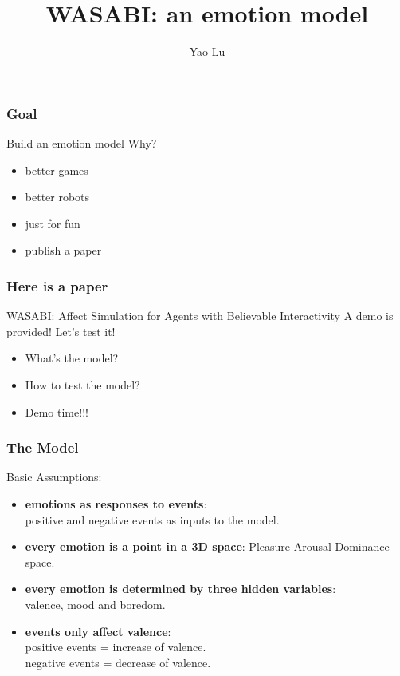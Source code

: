 \documentclass{beamer}
\begin{document}
\title{WASABI: an emotion model}   
\author{Yao Lu} 
\date{} 

\maketitle

\begin{frame}
\frametitle{Goal}
Build an emotion model
\newline \newline \newline
Why?
\begin{itemize}
\item better games
\item better robots
\item just for fun
\item publish a paper
\end{itemize}
\end{frame}

\begin{frame}
\frametitle{Here is a paper}
WASABI: Affect Simulation for Agents with
Believable Interactivity 
\newline \newline \newline
A demo is provided!
\newline \newline \newline
Let's test it!
\begin{itemize}
\item What's the model?
\item How to test the model?
\item Demo time!!!
\end{itemize}
\end{frame}


\begin{frame}
\frametitle{The Model}
Basic Assumptions:
\begin{itemize}
\item \textbf{emotions as responses to events}: \\ positive and negative events as inputs to the model.
\item \textbf{every emotion is a point in a 3D space}: Pleasure-Arousal-Dominance space.
\item \textbf{every emotion is determined by three hidden variables}: \\
valence, mood and boredom.
\item \textbf{events only affect valence}: \\
positive events = increase of valence.\\
negative events = decrease of valence.
\end{itemize}
\end{frame}
\end{document}
